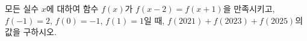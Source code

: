 모든 실수 $x$에 대하여 함수 $f(x)$가 $f(x-2)=f(x+1)$을 만족시키고, $f(-1)=2$, $f(0)=-1$, $f(1)=1$일 때, $f(2021)+f(2023)+f(2025)$의 값을 구하시오.
